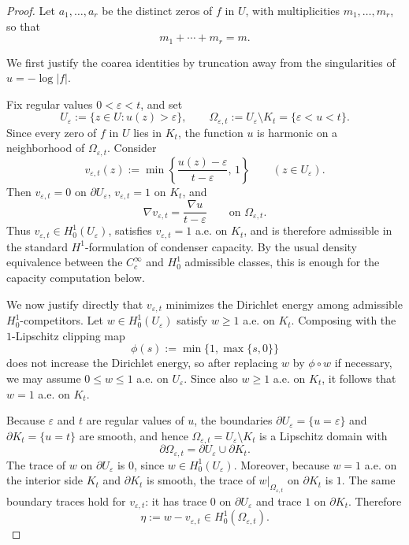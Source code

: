 \documentclass[12pt]{amsart}
\theoremstyle{definition}
\theoremstyle{remark}
\begin{document}
\begin{proof}
Let \(a_1,\dots,a_r\) be the distinct zeros of \(f\) in \(U\), with multiplicities
\(m_1,\dots,m_r\), so that
\[
m_1+\cdots+m_r=m.
\]

We first justify the coarea identities by truncation away from the singularities of
\(u=-\log|f|\). 


Fix regular values $0<\varepsilon<t$, and set
\[
U_\varepsilon:=\{z\in U:u(z)>\varepsilon\},
\qquad
\Omega_{\varepsilon,t}:=U_\varepsilon\setminus K_t=\{\varepsilon<u<t\}.
\]
Since every zero of $f$ in $U$ lies in $K_t$, the function $u$ is harmonic on a neighborhood of $\Omega_{\varepsilon,t}$. Consider
\[
v_{\varepsilon,t}(z):=\min\!\left\{\frac{u(z)-\varepsilon}{t-\varepsilon},\,1\right\}
\qquad (z\in U_\varepsilon).
\]
Then $v_{\varepsilon,t}=0$ on $\partial U_\varepsilon$, $v_{\varepsilon,t}=1$ on $K_t$, and
\[
\nabla v_{\varepsilon,t}=\frac{\nabla u}{t-\varepsilon}
\qquad\text{on }\Omega_{\varepsilon,t}.
\]
Thus $v_{\varepsilon,t}\in H_0^1(U_\varepsilon)$, satisfies $v_{\varepsilon,t}=1$ a.e. on $K_t$, and is therefore admissible in the standard $H^1$-formulation of condenser capacity. By the usual density equivalence between the $C_c^\infty$ and $H_0^1$ admissible classes, this is enough for the capacity computation below.

We now justify directly that $v_{\varepsilon,t}$ minimizes the Dirichlet energy among admissible $H_0^1$-competitors. Let $w\in H_0^1(U_\varepsilon)$ satisfy $w\ge 1$ a.e. on $K_t$. Composing with the $1$-Lipschitz clipping map
\[
\phi(s):=\min\{1,\max\{s,0\}\}
\]
does not increase the Dirichlet energy, so after replacing $w$ by $\phi\circ w$ if necessary, we may assume $0\le w\le 1$ a.e. on $U_\varepsilon$. Since also $w\ge 1$ a.e. on $K_t$, it follows that $w=1$ a.e. on $K_t$.

Because $\varepsilon$ and $t$ are regular values of $u$, the boundaries $\partial U_\varepsilon=\{u=\varepsilon\}$ and $\partial K_t=\{u=t\}$ are smooth, and hence $\Omega_{\varepsilon,t}=U_\varepsilon\setminus K_t$ is a Lipschitz domain with
\[
\partial\Omega_{\varepsilon,t}=\partial U_\varepsilon\cup \partial K_t.
\]
The trace of $w$ on $\partial U_\varepsilon$ is $0$, since $w\in H_0^1(U_\varepsilon)$. Moreover, because $w=1$ a.e. on the interior side $K_t$ and $\partial K_t$ is smooth, the trace of $w|_{\Omega_{\varepsilon,t}}$ on $\partial K_t$ is $1$. The same boundary traces hold for $v_{\varepsilon,t}$: it has trace $0$ on $\partial U_\varepsilon$ and trace $1$ on $\partial K_t$. Therefore
\[
\eta:=w-v_{\varepsilon,t}\in H_0^1(\Omega_{\varepsilon,t}).
\]


\end{proof}
\end{document}
